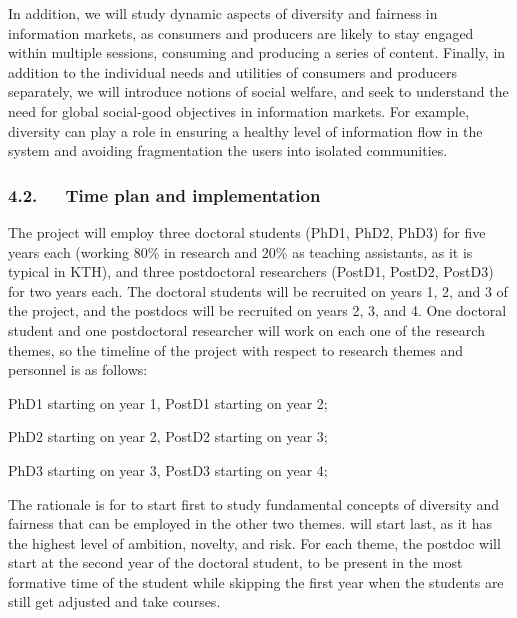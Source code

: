 \documentclass[a4paper,11pt]{article}
\begin{document}
In addition, we will study dynamic aspects of diversity and fairness in information markets,
as consumers and producers are likely to stay engaged within multiple sessions, 
consuming and producing a series of content.
Finally, in addition to the individual needs and utilities of consumers and producers separately, 
we will introduce notions of social welfare, 
and seek to understand the need for global social-good objectives in information markets.
For example, diversity can play a role in ensuring a healthy level of information flow in the system
and avoiding fragmentation the users into isolated communities.

\subsubsection*{4.2.~~~Time plan and implementation}


The project will employ three doctoral students (PhD1, PhD2, PhD3) for five years each 
(working 80\% in research and 20\% as teaching assistants, as it is typical in KTH), 
and three postdoctoral researchers (PostD1, PostD2, PostD3) for two years each. 
The doctoral students will be recruited on years 1, 2, and 3 of the project, 
and the postdocs will be recruited on years 2, 3, and 4. 
One doctoral student and one postdoctoral researcher will work on each one of the research themes,
so the timeline of the project with respect to research themes and personnel is as follows:
\vspace{-2mm}
\begin{description}
\setlength{\itemsep}{-4pt}
\item[1.~~{\exploration}\,:] 
PhD1 starting on year 1, PostD1 starting on year 2;
\item[2.~~{\networks}\,:]
PhD2 starting on year 2, PostD2 starting on year 3;
\item[3.~~{\markets}\,:]
PhD3 starting on year 3, PostD3 starting on year 4;
\end{description}
\vspace{-2mm}
The rationale is for \exploration to start first to study 
fundamental concepts of diversity and fairness that can be employed in the other two themes.
\markets will start last, as it has the highest level of ambition, novelty, and risk.
For each theme, the postdoc will start at the second year of the doctoral student, 
to be present in the most formative time of the student while skipping the first year when 
the students are still get adjusted and take courses.
\end{document}
